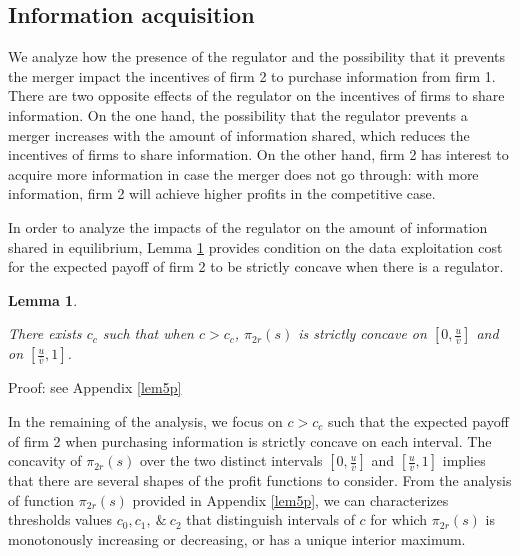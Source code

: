 \documentclass[a4paper,leqno]{article}%
\newtheorem{lemma}{Lemma}
\newcommand{\ov}{\overline{v}}
\begin{document}
\medskip

\subsection{Information acquisition}

We analyze how the presence of the regulator and the possibility that it prevents the merger impact the incentives of firm 2 to purchase information from firm 1. There are two opposite effects of the regulator on the incentives of firms to share information. On the one hand, the possibility that the regulator prevents a merger increases with the amount of information shared, which reduces the incentives of firms to share information. On the other hand, firm 2 has interest to acquire more information in case the merger does not go through: with more information, firm 2 will achieve higher profits in the competitive case. 

In order to analyze the impacts of the regulator on the amount of information shared in equilibrium, Lemma \ref{lem5} provides condition on the data exploitation cost for the expected payoff of firm 2 to be strictly concave when there is a regulator. 

\begin{lemma}~~\label{lem5}

There exists $c_{c}$ such that when $c>c_{c}$, $\pi_{2r}(s)$ is strictly concave on $[0,\frac{u}{\ov}]$ and on $[\frac{u}{\ov},1]$.

\end{lemma}

\noindent Proof: see Appendix \ref{lem5p}

\noindent In the remaining of the analysis, we focus on $c>c_{c}$ such that the expected payoff of firm 2 when purchasing information is strictly concave on each interval. The concavity of $\pi_{2r}(s)$ over the two distinct intervals $[0,\frac{u}{\ov}]$ and $[\frac{u}{\ov},1]$ implies that there are several shapes of the profit functions to consider. From the analysis of function $\pi_{2r}(s)$ provided in Appendix \ref{lem5p}, we can characterizes thresholds values $c_0,c_1,~\&~c_2$ that distinguish intervals of $c$ for which $\pi_{2r}(s)$ is monotonously increasing or decreasing, or has a unique interior maximum. 
\end{document}
